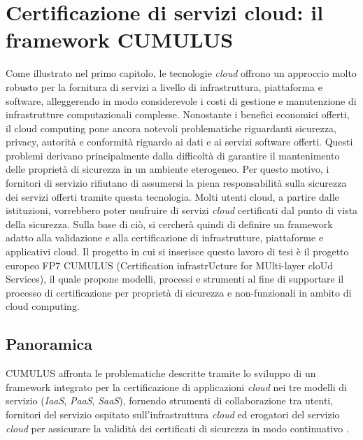 \documentclass[../main.tex]{subfiles}
\begin{document}
\chapter{Certificazione di servizi cloud: il framework CUMULUS}

Come illustrato nel primo capitolo, le tecnologie \textit{cloud} offrono un approccio molto robusto per la fornitura di servizi a livello di infrastruttura, piattaforma e software, alleggerendo in modo considerevole i costi di gestione e manutenzione di infrastrutture computazionali complesse.
Nonostante i benefici economici offerti, il cloud computing pone ancora notevoli problematiche riguardanti sicurezza, privacy, autorità e conformità riguardo ai dati e ai servizi software offerti.
Questi problemi derivano principalmente dalla difficoltà di garantire il mantenimento delle proprietà di sicurezza in un ambiente eterogeneo. Per questo motivo, i fornitori di servizio rifiutano di assumersi la piena responsabilità sulla sicurezza dei servizi offerti tramite questa tecnologia.
Molti utenti cloud, a partire dalle istituzioni, vorrebbero poter usufruire di servizi \textit{cloud} certificati dal punto di vista della sicurezza.
Sulla base di ciò, si cercherà quindi di definire un framework adatto alla validazione e alla certificazione di infrastrutture, piattaforme e applicativi cloud.
Il progetto in cui si inserisce questo lavoro di tesi è il progetto europeo FP7 CUMULUS (Certification infrastrUcture for MUlti-layer cloUd Services), il quale propone modelli, processi e strumenti al fine di supportare il processo di certificazione per proprietà di sicurezza e non-funzionali in ambito di cloud computing.

\section{Panoramica}
CUMULUS affronta le problematiche descritte tramite lo sviluppo di un framework integrato per la certificazione di applicazioni \textit{cloud} nei tre modelli di servizio (\textit{IaaS}, \textit{PaaS}, \textit{SaaS}), fornendo strumenti di collaborazione tra utenti, fornitori del servizio ospitato sull'infrastruttura \textit{cloud} ed erogatori del servizio \textit{cloud} per assicurare la validità dei certificati di sicurezza in modo continuativo \cite{SpanoudakisDamiani}.
\end{document}
